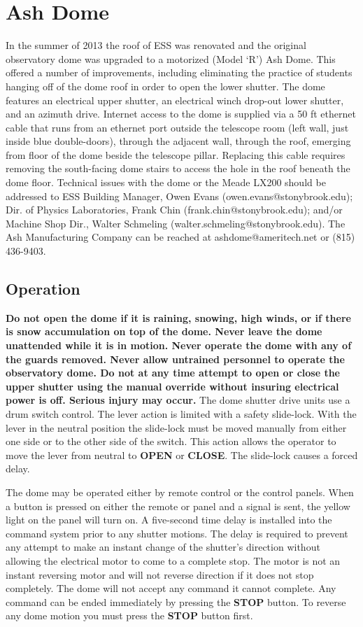 \documentclass[12pt,titlepage]{article}
\begin{document}
\section{Ash Dome}
In the summer of 2013 the roof of ESS was renovated and the original observatory dome was upgraded to a motorized (Model `R') Ash Dome.
This offered a number of improvements, including eliminating the practice of students hanging off of the dome roof in order to open the lower shutter.
The dome features an electrical upper shutter, an electrical winch drop-out lower shutter, and an azimuth drive.
Internet access to the dome is supplied via a 50 ft ethernet cable that runs from an ethernet port outside the telescope room (left wall, just inside blue double-doors), through the adjacent wall, through the roof, emerging from floor of the dome beside the telescope pillar.
Replacing this cable requires removing the south-facing dome stairs to access the hole in the roof beneath the dome floor.
Technical issues with the dome or the Meade LX200 should be addressed to ESS Building Manager, Owen Evans (owen.evans@stonybrook.edu); Dir. of Physics Laboratories, Frank Chin (frank.chin@stonybrook.edu); and/or Machine Shop Dir., Walter Schmeling (walter.schmeling@stonybrook.edu). The Ash Manufacturing Company can be reached at ashdome@ameritech.net or (815) 436-9403.

\subsection{Operation}
\textbf{Do not open the dome if it is raining, snowing, high winds, or if there is snow accumulation on top of the dome.
Never leave the dome unattended while it is in motion.
Never operate the dome with any of the guards removed.
Never allow untrained personnel to operate the observatory dome.
Do not at any time attempt to open or close the upper shutter using the manual override without insuring electrical power is off.
Serious injury may occur.}
The dome shutter drive units use a drum switch control.
The lever action is limited with a safety slide-lock.
With the lever in the neutral position the slide-lock must be moved manually from either one side or to the other side of the switch.
This action allows the operator to move the lever from neutral to \textbf{OPEN} or \textbf{CLOSE}.
The slide-lock causes a forced delay.
\par The dome may be operated either by remote control or the control panels.
When a button is pressed on either the remote or panel and a signal is sent, the yellow light on the panel will turn on.
A five-second time delay is installed into the command system prior to any shutter motions.
The delay is required to prevent any attempt to make an instant change of the shutter's direction without allowing the electrical motor to come to a complete stop.
The motor is not an instant reversing motor and will not reverse direction if it does not stop completely.
The dome will not accept any command it cannot complete.
Any command can be ended immediately by pressing the \textbf{STOP} button.
To reverse any dome motion you must press the \textbf{STOP} button first. 
\end{document}
